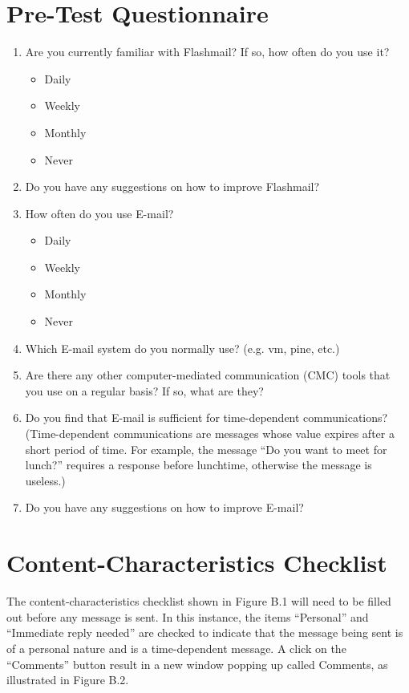 \chapter{Pre-Test Questionnaire}
\begin{enumerate}
\item Are you currently familiar with Flashmail?  If so, how often do you
  use it?
  \begin{itemize}
  \item Daily \item Weekly \item Monthly \item Never
  \end{itemize}
\item Do you have any suggestions on how to improve Flashmail?
\item How often do you use E-mail?
  \begin{itemize}
  \item Daily \item Weekly \item Monthly \item Never
  \end{itemize}
\item Which E-mail system do you normally use? (e.g. vm, pine, etc.)
\item Are there any other computer-mediated communication (CMC) tools that
  you use on a regular basis?  If so, what are they?
\item Do you find that E-mail is sufficient for time-dependent
  communications?  (Time-dependent communications are messages whose value
  expires after a short period of time.  For example, the message ``Do you
  want to meet for lunch?'' requires a response before lunchtime, otherwise
  the message is useless.)
\item Do you have any suggestions on how to improve E-mail?
\end{enumerate}

\newpage
\chapter{Content-Characteristics Checklist}
The content-characteristics checklist shown in Figure B.1 will need to be
filled out before any message is sent.  In this instance, the items
``Personal'' and ``Immediate reply needed'' are checked to indicate that the
message being sent is of a personal nature and is a time-dependent
message. A click on the ``Comments'' button result in a new window popping
up called Comments, as illustrated in Figure B.2.


